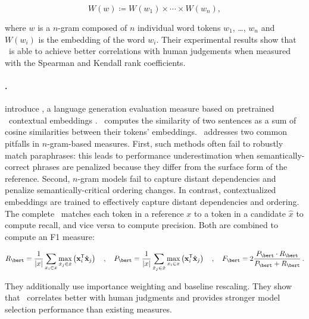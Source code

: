 \[ W(w) \coloneqq W(w_1) \times \cdots \times W(w_n) , \]

where $w$ is a $n$-gram composed of $n$ individual word tokens $w_1$, \dots, $w_n$ and $W(w_i)$ is the embedding of the word $w_i$. Their experimental results show that \rougewe\ is able to achieve better correlations with human judgements when measured with the Spearman and Kendall rank coefficients.

\paragraph{\bertscore.}
\citet{zhang2019bertscore} introduce \bertscore, a language generation evaluation measure based on pretrained \bert\ contextual embeddings \citep{devlin-etal-2019-bert}. \bertscore\ computes the similarity of two sentences as a sum of cosine similarities between their tokens’ embeddings. \bertscore\ addresses two common pitfalls in $n$-gram-based measures. First, such methods often fail to robustly match paraphrases: this leads to performance underestimation when semantically-correct phrases are penalized because they differ from the surface form of the reference. Second, $n$-gram models fail to capture distant dependencies and penalize semantically-critical ordering changes. In contrast, contextualized embeddings are trained to effectively capture distant dependencies and ordering. The complete \bertscore\ matches each token in a reference $x$ to a token in a candidate $\hat{x}$ to compute recall, and vice versa to compute precision. Both are combined to compute an F1 measure:

\[ R_\bert = \frac{1}{|x|} \sum_{x_i \in x} \max_{\hat{x}_j \in \hat{x}} \left( \mathbf{x}_i^\mathsf{T} \hat{\mathbf{x}}_j \right) \quad , \quad P_\bert = \frac{1}{|x|} \sum_{\hat{x}_j \in \hat{x}} \max_{x_i \in x} \left( \mathbf{x}_i^\mathsf{T} \hat{\mathbf{x}}_j \right) \quad , \quad F_\bert = 2 \frac{P_\bert \cdot R_\bert}{P_\bert + R_\bert} \, .\]

They additionally use importance weighting and baseline rescaling. They show that \bertscore\ correlates better with human judgments and provides stronger model selection performance than existing measures.

